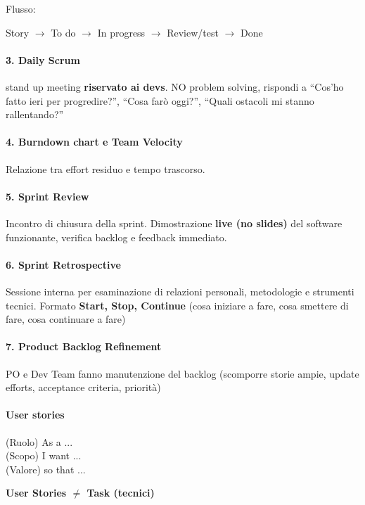 \documentclass[12pt]{extarticle}
\begin{document}
\noindent Flusso:
\begin{center}
    Story $\rightarrow$ To do $\rightarrow$ In progress $\rightarrow$ Review/test $\rightarrow$ Done
\end{center}

\paragraph{3. Daily Scrum} stand up meeting \textbf{riservato ai devs}. NO problem solving, rispondi a ``Cos'ho fatto ieri per progredire?'', ``Cosa farò oggi?'', ``Quali ostacoli mi stanno rallentando?''

\paragraph{4. Burndown chart e Team Velocity} Relazione tra effort residuo e tempo trascorso.

\paragraph{5. Sprint Review} Incontro di chiusura della sprint. Dimostrazione \textbf{live (no slides)} del software funzionante, verifica backlog e feedback immediato.

\paragraph{6. Sprint Retrospective} Sessione interna per esaminazione di relazioni personali, metodologie e strumenti tecnici. Formato \textbf{Start, Stop, Continue} (cosa iniziare a fare, cosa smettere di fare, cosa continuare a fare)

\paragraph{7. Product Backlog Refinement} PO e Dev Team fanno manutenzione del backlog (scomporre storie ampie, update efforts, acceptance criteria, priorità)

\paragraph{User stories}
\begin{center}
    (Ruolo) As a ... \\
    (Scopo) I want ... \\
    (Valore) so that ...
\end{center}
\textbf{User Stories $\neq$ Task (tecnici)}\\
\end{document}
